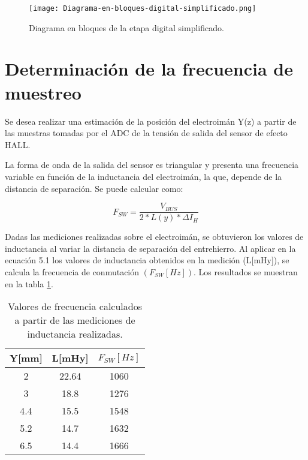 \begin{figure}[H]
	\centering
	\texttt{[image: Diagrama-en-bloques-digital-simplificado.png]}
	\caption{Diagrama en bloques de la etapa digital simplificado.}
	\label{fig:diag-en-bloques-digital-simplif}
\end{figure}


\section{Determinación de la frecuencia de muestreo}

\noindent Se desea realizar una estimación de la posición del electroimán Y(z)  a partir de las muestras tomadas por el ADC de la tensión de salida del sensor de efecto HALL.

\noindent La forma de onda de la salida del sensor es triangular y presenta una frecuencia variable en función de la inductancia del electroimán, la que, depende de la distancia de separación. Se puede calcular como:

\begin{equation} \label{eq_frecuencia-de-muestreo}
	F_{SW}=\frac{V_{BUS}}{2 * L(y) * \Delta I_H}
\end{equation}

\noindent Dadas las mediciones realizadas sobre el electroimán, se obtuvieron los valores de inductancia al variar la distancia de separación del entrehierro. Al aplicar en la ecuación 5.1 los valores de inductancia obtenidos en la medición (L[mHy]), se calcula la frecuencia de conmutación  $(F_{SW}[Hz])$. Los resultados se muestran en la tabla \ref{frecuencias-calculadas}.


\begin{table}[H]
	\begin{center}
		\begin{tabular}{| c | c | c |}
			\hline
			Y[mm] & L[mHy] & $F_{SW}[Hz]$\\ \hline
			2 & 22.64 & 1060\\ \hline
			3 & 18.8 & 1276\\ \hline
			4.4 & 15.5 & 1548\\ \hline
			5.2 & 14.7 & 1632\\ \hline		
			6.5 & 14.4 & 1666\\ \hline
		\end{tabular}
		\caption{Valores de frecuencia calculados a partir de las mediciones de inductancia realizadas.}
		\label{frecuencias-calculadas}
	\end{center}
\end{table}


